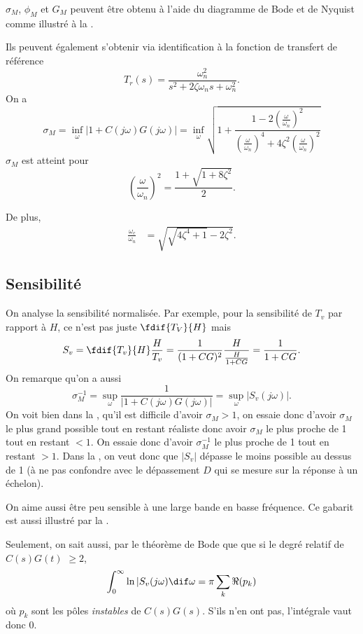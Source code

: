 $\sigma_M$, $\phi_M$ et $G_M$ peuvent être obtenu à l'aide
du diagramme de Bode et de Nyquist comme illustré à la .

Ils peuvent également s'obtenir via identification à la fonction
de transfert de référence
\[ T_r(s) = \frac{\omega_n^2}{s^2 + 2 \zeta \omega_n s + \omega_n^2}. \]
On a
\[ \sigma_M = \inf_\omega \left|1 + C(j\omega)G(j\omega)\right| =
\inf_\omega \sqrt{1 + \frac{1 - 2\left(\frac{\omega}{\omega_n}\right)^2}{\left(\frac{\omega}{\omega_n}\right)^4 + 4\zeta^2\left(\frac{\omega}{\omega_n}\right)^2}} \]
$\sigma_M$ est atteint pour
\[ \left(\frac{\omega}{\omega_n}\right)^2 = \frac{1 + \sqrt{1 + 8\zeta^2}}{2}. \]

De plus,
\begin{align*}
  \frac{\omega_c}{\omega_n} & = \sqrt{\sqrt{4\zeta^4 + 1} - 2\zeta^2}.
\end{align*}

\subsection{Sensibilité}
On analyse la sensibilité normalisée.
Par exemple, pour la sensibilité de $T_v$ par rapport à $H$,
ce n'est pas juste $\fdif{T_V}{H}$ mais
\[ S_v = \fdif{T_v}{H} \frac{H}{T_v} = \frac{1}{(1 + CG)^2}\frac{H}{\frac{H}{1+CG}} = \frac{1}{1+CG}. \]
On remarque qu'on a aussi
\[ \sigma_M^{-1} = \sup_\omega\frac{1}{|1+C(j\omega)G(j\omega)|}
= \sup_\omega |S_v(j\omega)|. \]
On voit bien dans la ,
qu'il est difficile d'avoir $\sigma_M > 1$, on essaie donc d'avoir $\sigma_M$
le plus grand possible tout en restant réaliste donc avoir $\sigma_M$ le plus proche
de 1 tout en restant $< 1$.
On essaie donc d'avoir $\sigma_M^{-1}$ le plus proche de 1 tout en restant $> 1$.
Dans la , on veut donc que $|S_v|$ dépasse le moins possible
au dessus de 1 (à ne pas confondre avec le dépassement $D$ qui se mesure sur la réponse
à un échelon).

On aime aussi être peu sensible à une large bande en basse fréquence.
Ce gabarit est aussi illustré par la .

Seulement, on sait aussi,
par le théorème de Bode\cite[p.~336]{astrom2010feedback}
que que si le degré relatif de $C(s)G(t)$ $\geq 2$,
\[ \int_0^\infty \ln|S_v(j\omega) \dif \omega = \pi \sum_k \Re(p_k) \]
où $p_k$ sont les pôles \emph{instables} de $C(s)G(s)$.
S'ils n'en ont pas, l'intégrale vaut donc 0.

